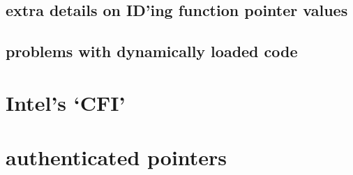\subsection{extra details on ID'ing function pointer values}


\subsection{problems with dynamically loaded code}


\section{Intel's `CFI'}


\section{authenticated pointers}




